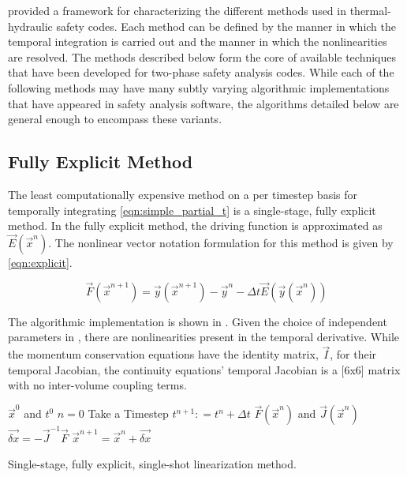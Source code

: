  provided a framework for characterizing the different methods used in thermal-hydraulic safety codes. 
Each method can be defined by the manner in which the temporal integration is carried out and the manner in which the nonlinearities are resolved.
The methods described below form the core of available techniques that have been developed for two-phase safety analysis codes. 
While each of the following methods may have many subtly varying algorithmic implementations that have appeared in safety analysis software, the algorithms detailed below are general enough to encompass these variants.

\subsection{Fully Explicit Method}
\label{subsect:numerics_explicit}
The least computationally expensive method on a per timestep basis for temporally integrating \eqref{eqn:simple_partial_t} is a single-stage, fully explicit method.
In the fully explicit method, the driving function is approximated as $\vec{E}(\vec{x}^n)$.
The nonlinear vector notation formulation for this method is given by \eqref{eqn:explicit}.

\begin{equation}
\label{eqn:explicit}
\vec{F}(\vec{x}^{n+1}) = \vec{y}(\vec{x}^{n+1}) - \vec{y}^{n} - \Delta t \vec{E}(\vec{y}(\vec{x}^{n}))
\end{equation}

The algorithmic implementation is shown in .
Given the choice of independent parameters in \cobra{}, there are nonlinearities present in the temporal derivative.
While the momentum conservation equations have the identity matrix, $\vec{I}$, for their temporal Jacobian, the continuity equations' temporal Jacobian is a [6x6] matrix with no inter-volume coupling terms.

\begin{algo}[ht!]
\setlength{\baselineskip}{0.625\baselineskip}
\begin{algorithmic}[1]
\Require $\vec{x}^{0}$ and $t^{0}$
\Set $n = 0$
\Loop \; Take a Timestep
    \State $t^{n+1} : = t^{n} + \Delta t$
    \Calculate $\vec{F}(\vec{x}^n)$ and $\vec{J}(\vec{x}^n)$
    \Calculate $\vec{\delta x} = -\vec{J}^{-1}\vec{F}$
    \Calculate $\vec{x}^{n+1} = \vec{x}^{n} + \vec{\delta x}$ 
\end{algorithmic}
\caption{Single-stage, fully explicit, single-shot linearization method.}
\label{algo:explicit}
\end{algo}

